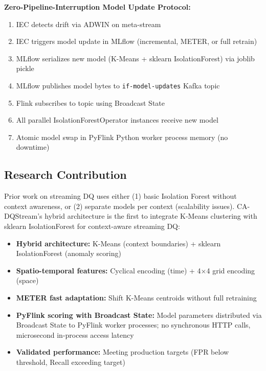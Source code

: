 \textbf{Zero-Pipeline-Interruption Model Update Protocol:}
\begin{enumerate}
    \item IEC detects drift via ADWIN on meta-stream
    \item IEC triggers model update in MLflow (incremental, METER, or full retrain)
    \item MLflow serializes new model (K-Means + sklearn IsolationForest) via joblib pickle
    \item MLflow publishes model bytes to \texttt{if-model-updates} Kafka topic
    \item Flink subscribes to topic using Broadcast State
    \item All parallel IsolationForestOperator instances receive new model
    \item Atomic model swap in PyFlink Python worker process memory (no downtime)
\end{enumerate}

\subsection{Research Contribution}

Prior work on streaming DQ uses either (1) basic Isolation Forest without context awareness, or (2) separate models per context (scalability issues). CA-DQStream's hybrid architecture is the first to integrate K-Means clustering with sklearn IsolationForest for context-aware streaming DQ:

\begin{itemize}
    \item \textbf{Hybrid architecture:} K-Means (context boundaries) + sklearn IsolationForest (anomaly scoring)
    \item \textbf{Spatio-temporal features:} Cyclical encoding (time) + 4$\times$4 grid encoding (space)
    \item \textbf{METER fast adaptation:} Shift K-Means centroids without full retraining
    \item \textbf{PyFlink scoring with Broadcast State:} Model parameters distributed via Broadcast State to PyFlink worker processes; no synchronous HTTP calls, microsecond in-process access latency
    \item \textbf{Validated performance:} Meeting production targets (FPR below threshold, Recall exceeding target)
\end{itemize}

